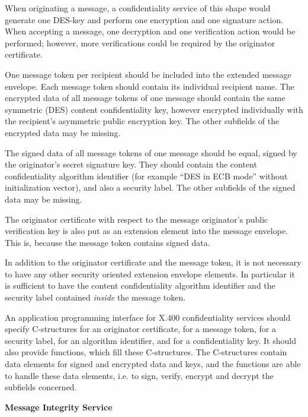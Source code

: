 When originating a message,
a confidentiality service of this shape would
generate one DES-key and
perform one encryption and one signature action.
When accepting a message,
one decryption and one verification action would be performed;
however, more verifications could be required by the originator certificate.

One message token per recipient should be included into the
extended message envelope.
Each message token should contain its individual recipient name.
The encrypted data of all message tokens of one message
should contain the same
symmetric (DES) content confidentiality key,
however encrypted individually with the recipient's
asymmetric public encryption key.
The other subfields of the encrypted data may be missing.

The signed data of all message tokens of one message should be equal,
signed by the originator's secret signature key.
They should contain the content confidentiality algorithm identifier
(for example ``DES in ECB mode'' without initialization vector),
and also a security label.
The other subfields of the signed data may be missing.

The originator certificate with respect to the message originator's
public verification key is also put as an
extension element into the message envelope.
This is, because the message token contains signed data.

In addition to the originator certificate and the message token,
it is not necessary to have any other security oriented
extension envelope elements. In particular
it is sufficient to have the content confidentiality algorithm identifier
and the security label contained {\em inside} the message token.

An application programming interface for X.400 confidentiality services
should specify C-structures
for an originator certificate,
for a message token,
for a security label,
for an algorithm identifier,
and for a confidentiality key.
It should also provide functions, which fill these C-structures.
The C-structures contain data elements for signed and encrypted data and keys,
and the functions are able to handle these data elements,
i.e. to sign, verify, encrypt and decrypt the subfields concerned.

{\bf Message Integrity Service}
\label{isw-mis}

